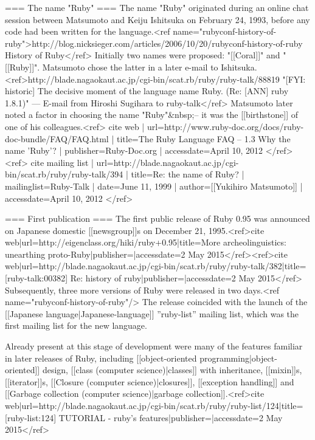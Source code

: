 === The name "Ruby" ===
The name "Ruby" originated during an online chat session between Matsumoto and Keiju Ishitsuka on February 24, 1993, before any code had been written for the language.<ref name="rubyconf-history-of-ruby">http://blog.nicksieger.com/articles/2006/10/20/rubyconf-history-of-ruby History of Ruby</ref> Initially two names were proposed: "[[Coral]]" and "[[Ruby]]". Matsumoto chose the latter in a later e-mail to Ishitsuka.<ref>http://blade.nagaokaut.ac.jp/cgi-bin/scat.rb/ruby/ruby-talk/88819 "[FYI: historic] The decisive moment of the language name Ruby. (Re: [ANN] ruby 1.8.1)" — E-mail from Hiroshi Sugihara to ruby-talk</ref> Matsumoto later noted a factor in choosing the name "Ruby"&nbsp;– it was the [[birthstone]] of one of his colleagues.<ref>
{{cite web
 | url=http://www.ruby-doc.org/docs/ruby-doc-bundle/FAQ/FAQ.html
 | title=The Ruby Language FAQ – 1.3 Why the name 'Ruby'?
 | publisher=Ruby-Doc.org
 | accessdate=April 10, 2012}}
</ref><ref>
{{cite mailing list
 | url=http://blade.nagaokaut.ac.jp/cgi-bin/scat.rb/ruby/ruby-talk/394
 | title=Re: the name of Ruby?
 | mailinglist=Ruby-Talk
 | date=June 11, 1999
 | author=[[Yukihiro Matsumoto]]
 | accessdate=April 10, 2012}}
</ref>

=== First publication ===
The first public release of Ruby 0.95 was announced on Japanese domestic [[newsgroup]]s on December 21, 1995.<ref>{{cite web|url=http://eigenclass.org/hiki/ruby+0.95|title=More archeolinguistics: unearthing proto-Ruby|publisher=|accessdate=2 May 2015}}</ref><ref>{{cite web|url=http://blade.nagaokaut.ac.jp/cgi-bin/scat.rb/ruby/ruby-talk/382|title=[ruby-talk:00382] Re: history of ruby|publisher=|accessdate=2 May 2015}}</ref> Subsequently, three more versions of Ruby were released in two days.<ref name="rubyconf-history-of-ruby"/> The release coincided with the launch of the [[Japanese language|Japanese-language]] ''ruby-list'' mailing list, which was the first mailing list for the new language.

Already present at this stage of development were many of the features familiar in later releases of Ruby, including [[object-oriented programming|object-oriented]] design, [[class (computer science)|classes]] with inheritance, [[mixin]]s, [[iterator]]s, [[Closure (computer science)|closures]], [[exception handling]] and [[Garbage collection (computer science)|garbage collection]].<ref>{{cite web|url=http://blade.nagaokaut.ac.jp/cgi-bin/scat.rb/ruby/ruby-list/124|title=[ruby-list:124] TUTORIAL - ruby's features|publisher=|accessdate=2 May 2015}}</ref>

